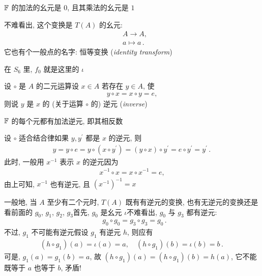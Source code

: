 \begin{example}
    $\mathbb{F}$ 的加法的幺元是 $0$, 且其乘法的幺元是 $1$\period
\end{example}

\begin{example}
    不难看出, 这个变换是 $T(A)$ 的幺元:
    \begin{align*}
         & A \to A,  \tag*{$\iota$:} \\
         & a \mapsto a \period
    \end{align*}
    它也有个一般点的名字: 恒等变换 (\textit{identity transform})\period

    在 $S_6$ 里, $f_0$ 就是这里的 $\iota$\period
\end{example}

\begin{definition}
    设 $\circ$ 是 $A$ 的二元运算\period 设 $x \in A$ 若存在 $y \in A$, 使
    \begin{align*}
        y \circ x = x \circ y = e,
    \end{align*}
    则说 $y$ 是 $x$ 的 (关于运算 $\circ$ 的) 逆元 (\textit{inverse})\period
\end{definition}

\begin{example}
    $\mathbb{F}$ 的每个元都有加法逆元, 即其相反数\period
\end{example}

\begin{remark}
    设 $\circ$ 适合结合律\period 如果 $y, y^{\prime}$ 都是 $x$ 的逆元, 则
    \begin{align*}
        y = y \circ e = y \circ (x \circ y^{\prime}) = (y \circ x) \circ y^{\prime} = e \circ y^{\prime} = y^{\prime} \period
    \end{align*}
    此时, 一般用 $x^{-1}$ 表示 $x$ 的逆元\period 因为
    \begin{align*}
        x^{-1} \circ x = x \circ x^{-1} = e,
    \end{align*}
    由上可知, $x^{-1}$ 也有逆元, 且 $(x^{-1})^{-1} = x$\period
\end{remark}

\begin{example}
    一般地, 当 $A$ 至少有二个元时, $T(A)$ 既有有逆元的变换, 也有无逆元的变换\period 还是看前面的 $g_0$, $g_1$, $g_2$, $g_3$\period 首先, $g_0$ 是幺元 $\iota$\period 不难看出, $g_0$ 与 $g_3$ 都有逆元:
    \begin{align*}
         & g_0 \circ g_0 = g_3 \circ g_3 = g_0 \period
    \end{align*}
    不过, $g_1$ 不可能有逆元\period 假设 $g_1$ 有逆元 $h$, 则应有
    \begin{align*}
        (h \circ g_1)(a) = \iota(a) = a, \quad (h \circ g_1)(b) = \iota(b) = b \period
    \end{align*}
    可是, $g_1(a) = g_1(b) = a$, 故 $(h \circ g_1)(a) = (h \circ g_1)(b) = h(a)$, 它不能既等于 $a$ 也等于 $b$, 矛盾!
\end{example}

